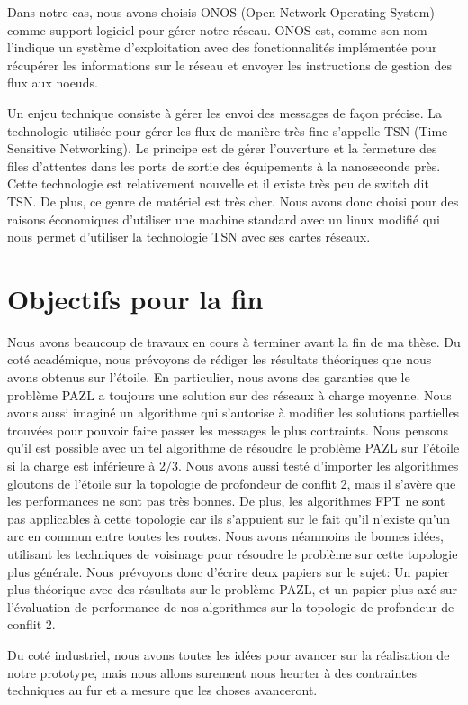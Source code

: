 \documentclass{article}
\begin{document}
Dans notre cas, nous avons choisis ONOS (Open Network Operating System) comme support logiciel pour gérer notre réseau. ONOS est, comme son nom l'indique un système d'exploitation avec des fonctionnalités implémentée pour récupérer les informations sur le réseau et envoyer les instructions de gestion des flux aux noeuds.

Un enjeu technique consiste à gérer les envoi des messages de façon précise. La technologie utilisée pour gérer les flux de manière très fine s'appelle TSN  (Time Sensitive Networking). Le principe est de gérer l'ouverture et la fermeture des files d'attentes dans les ports de sortie des équipements à la nanoseconde près. Cette technologie est relativement nouvelle et il existe très peu de switch dit TSN. De plus, ce genre de matériel est très cher. Nous avons donc choisi pour des raisons économiques d'utiliser une machine standard avec un linux modifié qui nous permet d'utiliser la technologie TSN avec ses cartes réseaux.


\section{Objectifs pour la fin}

Nous avons beaucoup de travaux en cours à terminer avant la fin de ma thèse. Du coté académique, nous prévoyons de rédiger les résultats théoriques que nous avons obtenus sur l'étoile. En particulier, nous avons des garanties que le problème PAZL a toujours une solution sur des réseaux à charge moyenne. Nous avons aussi imaginé un algorithme qui s'autorise à modifier les solutions partielles trouvées pour pouvoir faire passer les messages le plus contraints. Nous pensons qu'il est possible avec un tel algorithme de résoudre le problème PAZL sur l'étoile si la charge est inférieure à $2/3$.
Nous avons aussi testé d'importer les algorithmes gloutons de l'étoile sur la topologie de profondeur de conflit 2, mais il s'avère que les performances ne sont pas très bonnes.  De plus, les algorithmes FPT ne sont pas applicables à cette topologie car ils s'appuient sur le fait qu'il n'existe qu'un arc en commun entre toutes les routes.
Nous avons néanmoins de bonnes idées, utilisant les techniques de voisinage pour résoudre le problème sur cette topologie plus générale.
Nous prévoyons donc d'écrire deux papiers sur le sujet: Un papier plus théorique avec des résultats sur le problème PAZL, et un papier plus axé sur l'évaluation de performance de nos algorithmes sur la topologie de profondeur de conflit 2.

Du coté industriel, nous avons toutes les idées pour avancer sur la réalisation de notre prototype, mais nous allons surement nous heurter à des contraintes techniques au fur et a mesure que les choses avanceront.



\end{document}
